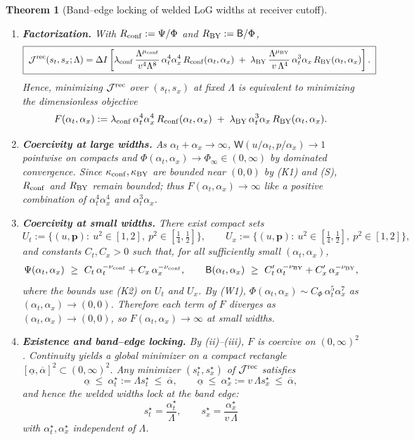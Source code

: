 \documentclass[10pt]{article}
\theoremstyle{definition}
\theoremstyle{plain}
\newtheorem{theorem}{Theorem}[section]
\begin{document}
\begin{theorem}[Band–edge locking of welded LoG widths at receiver cutoff]
\begin{enumerate}
\item[(i)] \textbf{Factorization.} With $R_{\rm conf}:=\Psi/\Phi$ and $R_{\rm BY}:=\mathsf B/\Phi$,
\[
\boxed{\;
\mathcal J^{\rm rec}(s_t,s_x;\Lambda)
=\Delta I\left[
\lambda_{\rm conf}\,\frac{\Lambda^{\mu_{\rm conf}}}{v^{4}\Lambda^{8}}\,
\alpha_t^{4}\alpha_x^{4}\,R_{\rm conf}(\alpha_t,\alpha_x)
\;+\;
\lambda_{\rm BY}\,\frac{\Lambda^{\mu_{\rm BY}}}{\,v\,\Lambda^{4}}\,
\alpha_t^{3}\alpha_x\,R_{\rm BY}(\alpha_t,\alpha_x)
\right].
\;}
\]
Hence, minimizing $\mathcal J^{\rm rec}$ over $(s_t,s_x)$ at fixed $\Lambda$ is equivalent to minimizing the dimensionless objective
\[
F(\alpha_t,\alpha_x)
:=\lambda_{\rm conf}\,\alpha_t^{4}\alpha_x^{4}\,R_{\rm conf}(\alpha_t,\alpha_x)
\;+\;\lambda_{\rm BY}\,\alpha_t^{3}\alpha_x\,R_{\rm BY}(\alpha_t,\alpha_x).
\]

\item[(ii)] \textbf{Coercivity at large widths.} As $\alpha_t+\alpha_x\to\infty$,
$\mathsf W(u/\alpha_t,p/\alpha_x)\to 1$ pointwise on compacts and $\Phi(\alpha_t,\alpha_x)\to\Phi_\infty\in(0,\infty)$ by dominated convergence. Since $\kappa_{\rm conf},\kappa_{\rm BY}$ are bounded near $(0,0)$ by (K1) and (S), $R_{\rm conf}$ and $R_{\rm BY}$ remain bounded; thus $F(\alpha_t,\alpha_x)\to\infty$ like a positive combination of $\alpha_t^{4}\alpha_x^{4}$ and $\alpha_t^{3}\alpha_x$.

\item[(iii)] \textbf{Coercivity at small widths.} There exist compact sets
\[
U_t:=\{(u,\mathbf p):\ u^2\in[1,2],\ p^2\in[\tfrac14,\tfrac12]\},\qquad
U_x:=\{(u,\mathbf p):\ u^2\in[\tfrac14,\tfrac12],\ p^2\in[1,2]\},
\]
and constants $C_t,C_x>0$ such that, for all sufficiently small $(\alpha_t,\alpha_x)$,
\[
\Psi(\alpha_t,\alpha_x)\ \ge\ C_t\,\alpha_t^{-\nu_{\rm conf}}+C_x\,\alpha_x^{-\nu_{\rm conf}},
\qquad
\mathsf B(\alpha_t,\alpha_x)\ \ge\ C_t'\,\alpha_t^{-\nu_{\rm BY}}+C_x'\,\alpha_x^{-\nu_{\rm BY}},
\]
where the bounds use (K2) on $U_t$ and $U_x$. By (W1), $\Phi(\alpha_t,\alpha_x)\sim C_\Phi\,\alpha_t^{5}\alpha_x^{7}$ as $(\alpha_t,\alpha_x)\to(0,0)$.
Therefore each term of $F$ diverges as $(\alpha_t,\alpha_x)\to(0,0)$, so $F(\alpha_t,\alpha_x)\to\infty$ at small widths.

\item[(iv)] \textbf{Existence and band–edge locking.} By (ii)–(iii), $F$ is coercive on $(0,\infty)^2$. Continuity yields a global minimizer on a compact rectangle $[\underline\alpha,\overline\alpha]^2\subset(0,\infty)^2$. Any minimizer $(s_t^\star,s_x^\star)$ of $\mathcal J^{\rm rec}$ satisfies
\[
\underline\alpha\ \le\ \alpha_t^\star:=\Lambda s_t^\star\ \le\ \overline\alpha,\qquad
\underline\alpha\ \le\ \alpha_x^\star:=v\,\Lambda s_x^\star\ \le\ \overline\alpha,
\]
and hence the welded widths \emph{lock at the band edge}:
\[
\boxed{\quad s_t^\star=\frac{\alpha_t^\star}{\Lambda},\qquad s_x^\star=\frac{\alpha_x^\star}{v\,\Lambda}\quad}
\]
with $\alpha_t^\star,\alpha_x^\star$ independent of $\Lambda$.


\end{enumerate}
\end{theorem}
\end{document}
